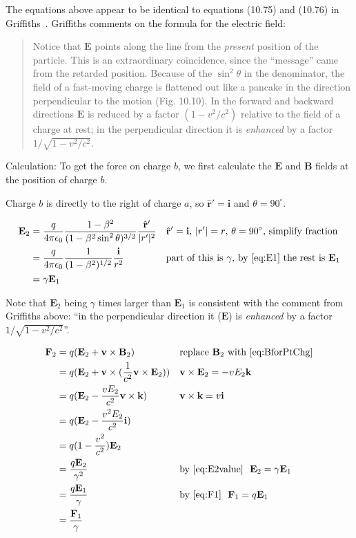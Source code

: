 \documentclass[a4paper]{article}
\theoremstyle{plain}
\theoremstyle{definition}
\newcommand{\ihat}{\mathbf{i}}
\newcommand{\khat}{\mathbf{k}}
\newcommand{\rhat}{\hat{\mathbf{r}}}
\newcommand{\vect}[1]{\mathbf{#1}}
\begin{document}
The equations above appear to be identical to equations (10.75) and
(10.76) in Griffiths~\cite{Griffiths1998}.  Griffiths comments on the formula for the electric field:

\begin{quote}
Notice that $\vect{E}$ points along the line from the {\em present}
position of the particle.  This is an extraordinary coincidence, since
the ``message'' came from the retarded position.  Because of the
$\sin^2 \theta$ in the denominator, the field of a fast-moving charge
is flattened out like a pancake in the direction perpendicular to the
motion (Fig. 10.10).  In the forward and backward directions
$\vect{E}$ is reduced by a factor $(1 - v^2/c^2)$ relative to the
field of a charge at rest; in the perpendicular direction it is
{\em enhanced} by a factor $1 / \sqrt{ 1 - v^2/c^2}$.
\end{quote}

Calculation: To get the force on charge $b$, we first calculate the
$\vect{E}$ and $\vect{B}$ fields at the position of charge $b$.

Charge $b$ is directly to the right of charge $a$, so ${\rhat}' = \ihat$
and $\theta = 90^{\circ}$.

\begin{align}
\vect{E}_2
  & = \frac{q}{4 \pi \epsilon_0} \frac{1-\beta^2}{(1-\beta^2 \sin^2 \theta)^{3/2}} \frac{{\rhat}'}{|r'|^2} & & \text{${\rhat}' = \ihat$, $|r'| = r$, $\theta=90^{\circ}$, simplify fraction} \nonumber \\
  & = \frac{q}{4 \pi \epsilon_0} \frac{1}{(1-\beta^2)^{1/2}} \frac{\ihat}{r^2} & & \text{part of this is $\gamma$, by~\eqref{eq:E1} the rest is $\vect{E}_1$} \nonumber \\
  & = \gamma \vect{E}_1 \label{eq:E2value}
\end{align}

Note that $\vect{E}_2$ being $\gamma$ times larger than $\vect{E}_1$
is consistent with the comment from Griffiths above: ``in the
perpendicular direction it ($\vect{E}$) is {\em enhanced} by a factor
$1 / \sqrt{ 1 - v^2/c^2}$''.

\begin{align*}
\vect{F}_2
  & = q (\vect{E}_2 + \vect{v} \times \vect{B}_2)   & & \text{replace $\vect{B}_2$ with \eqref{eq:BforPtChg}} \\
  & = q (\vect{E}_2 + \vect{v} \times (\frac{1}{c^2} \vect{v} \times \vect{E}_2))  & & \vect{v} \times \vect{E}_2 = - v E_2 \khat \\
  & = q (\vect{E}_2 - \frac{v E_2}{c^2} \vect{v} \times \khat)  & & \vect{v} \times \khat = v \ihat \\
  & = q (\vect{E}_2 - \frac{v^2 E_2}{c^2} \ihat) \\
  & = q (1 - \frac{v^2}{c^2}) \vect{E}_2 \\
  & = \frac{q \vect{E}_2}{\gamma^2} & & \text{by~\eqref{eq:E2value} \ } \vect{E}_2 = \gamma \vect{E}_1 \\
  & = \frac{q \vect{E}_1}{\gamma} & & \text{by~\eqref{eq:F1} \ } \vect{F}_1 = q \vect{E}_1 \\
  & = \frac{\vect{F}_1}{\gamma}
\end{align*}
\end{document}
